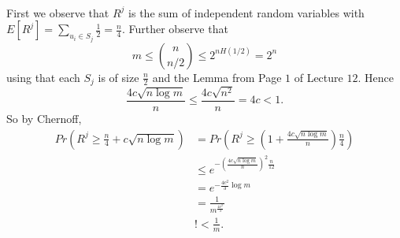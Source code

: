 \documentclass[letterpaper,12pt,oneside,onecolumn]{article}
\begin{document}
\paragraph{}
First we observe that $R^j$ is the sum of independent random variables with $E[R^j] = \sum_{u_i \in S_j} \frac{1}{2} = \frac{n}{4}$. Further observe that
 $$m \leq {n \choose n/2} \leq 2^{nH(1/2)} = 2^n$$
using that each $S_j$ is of size $\frac{n}{2}$ and the Lemma from Page $1$ of Lecture $12$.  Hence 
$$\frac{4c\sqrt{n\log m}}{n} \leq \frac{4c\sqrt{n^2}}{n}  = 4c < 1.$$
 So by Chernoff,
\begin{align*}
Pr(R^j \geq \frac{n}{4} + c\sqrt{n\log m}) &= Pr(R^j \geq (1+\frac{4c\sqrt{n\log m}}{n})\frac{n}{4})\\
 &\leq e^{-(\frac{4c\sqrt{n\log m}}{n})^2\frac{n}{12}} \\
 &= e^{-\frac{4c^2}{3}\log m}\\
 &=\frac{1}{m^{\frac{4c^2}{3}}}\\
 &!< \frac{1}{m}.
 \end{align*}

\newpage
\section{}

\newpage
\section{}

\newpage
\section{}
\end{document}
